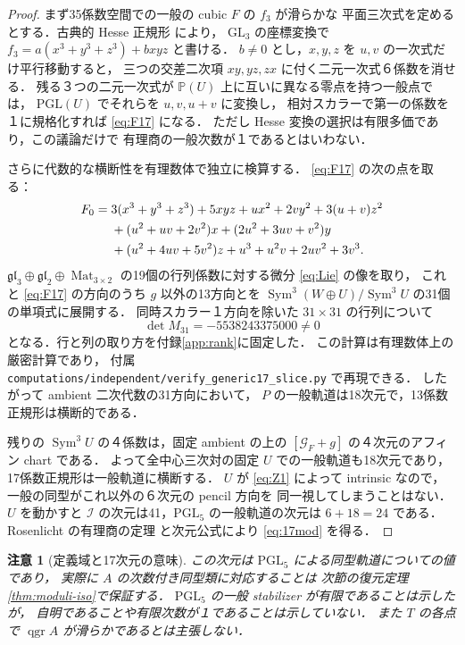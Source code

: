 \documentclass[11pt,a4paper]{ltjsarticle}
\numberwithin{equation}{section}
\newtheorem{remark}[theorem]{注意}
\newcommand{\PP}{\mathbb P}
\newcommand{\cI}{\mathcal I}
\newcommand{\Sym}{\operatorname{Sym}}
\newcommand{\qgr}{\operatorname{qgr}}
\newcommand{\GL}{\mathrm{GL}}
\newcommand{\PGL}{\mathrm{PGL}}
\begin{document}
\begin{proof}
まず35係数空間での一般の cubic $F$ の $f_3$ が滑らかな
平面三次式を定めるとする．古典的 Hesse 正規形
\cite[\S2, Lemma~2.1]{AD} により，
$\GL_3$ の座標変換で $f_3=a(x^3+y^3+z^3)+bxyz$ と書ける．
$b\ne0$ とし，$x,y,z$ を $u,v$ の一次式だけ平行移動すると，
三つの交差二次項 $xy,yz,zx$ に付く二元一次式６係数を消せる．
残る３つの二元一次式が $\PP(U)$ 上に互いに異なる零点を持つ一般点では，
$\PGL(U)$ でそれらを $u,v,u+v$ に変換し，
相対スカラーで第一の係数を１に規格化すれば \eqref{eq:F17} になる．
ただし Hesse 変換の選択は有限多価であり，この議論だけで
有理商の一般次数が１であるとはいわない．

さらに代数的な横断性を有理数体で独立に検算する．
\eqref{eq:F17} の次の点を取る：
\begin{align}\label{eq:F0}
 F_0={}&3(x^3+y^3+z^3)+5xyz+ux^2+2vy^2+3(u+v)z^2\notag\\
 &+(u^2+uv+2v^2)x+(2u^2+3uv+v^2)y\\
 &+(u^2+4uv+5v^2)z+u^3+u^2v+2uv^2+3v^3.\notag
\end{align}
$\mathfrak{gl}_3\oplus\mathfrak{gl}_2\oplus\operatorname{Mat}_{3\times2}$
の19個の行列係数に対する微分 \eqref{eq:Lie} の像を取り，
これと \eqref{eq:F17} の方向のうち $g$ 以外の13方向とを
$\Sym^3(W\oplus U)/\Sym^3U$ の31個の単項式に展開する．
同時スカラー１方向を除いた $31\times31$ の行列について
\begin{equation}\label{eq:det}
 \boxed{\det M_{31}=-5538243375000\ne0}
\end{equation}
となる．行と列の取り方を付録\ref{app:rank}に固定した．
この計算は有理数体上の厳密計算であり，
付属 \nolinkurl{computations/independent/verify_generic17_slice.py} で再現できる．
したがって ambient 二次代数の31方向において，
$P$ の一般軌道は18次元で，13係数正規形は横断的である．

残りの $\Sym^3U$ の４係数は，固定 ambient の上の
$[\mathcal G_F+g]$ の４次元のアフィン chart である．
よって全中心三次対の固定 $U$ での一般軌道も18次元であり，
17係数正規形は一般軌道に横断する．
$U$ が \eqref{eq:Z1} によって intrinsic なので，
一般の同型がこれ以外の６次元の pencil 方向を
同一視してしまうことはない．
$U$ を動かすと $\cI$ の次元は41，$\PGL_5$ の一般軌道の次元は
$6+18=24$ である．Rosenlicht の有理商の定理 \cite{Rosenlicht}
と次元公式により \eqref{eq:17mod} を得る．
\end{proof}

\begin{remark}[定義域と17次元の意味]\label{rem:meaning}
この次元は $\PGL_5$ による同型軌道についての値であり，
実際に $A$ の次数付き同型類に対応することは
次節の復元定理\ref{thm:moduli-iso}で保証する．
$\PGL_5$ の一般 stabilizer が有限であることは示したが，
自明であることや有限次数が１であることは示していない．
また $T$ の各点で $\qgr A$ が滑らかであるとは主張しない．
\end{remark}
\end{document}
